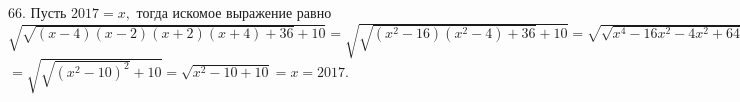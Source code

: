 66. Пусть $2017=x,$ тогда искомое выражение равно $\sqrt{\sqrt{(x-4)(x-2)(x+2)(x+4)+36}+10}=\sqrt{\sqrt{(x^2-16)(x^2-4)+36}+10}=
\sqrt{\sqrt{x^4-16x^2-4x^2+64+36}+10}=\sqrt{\sqrt{x^4-20x^2+100}+10}=$\\$=\sqrt{\sqrt{(x^2-10)^2}+10}=\sqrt{x^2-10+10}=x=2017.$\\
